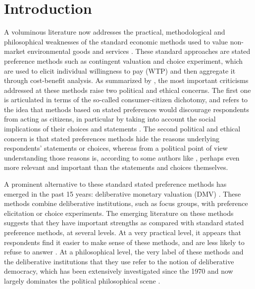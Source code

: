 \documentclass[version=3.21, pagesize, twoside=off, bibliography=totoc, DIV=calc, fontsize=12pt, a4paper, french, english]{scrartcl}
\begin{document}
\section{Introduction}
A voluminous literature now addresses the practical, methodological and philosophical weaknesses of the standard economic methods used to value non-market environmental goods and services \citep{meinard_ethical_2016}. 
These standard approaches are stated preference methods such as contingent valuation and choice experiment, which are used to elicit individual willingness to pay (WTP) and then aggregate it through cost-benefit analysis. 
As summarized by \citet{bartkowski_beyond_2018}, the most important criticisms addressed at these methods raise two political and ethical concerns. 
The first one is articulated in terms of the so-called consumer-citizen dichotomy, and refers to the idea that methods based on stated preferences would discourage respondents from acting as citizens, in particular by taking into account the social implications of their choices and statements \citep{soma_representing_2014, vatn_institutional_2009}. 
The second political and ethical concern is that stated preferences methods hide the reasons underlying respondents' statements or choices, whereas from a political point of view understanding those reasons is, according to some authors like \citet{sen_environmental_1995}, perhaps even more relevant and important than the statements and choices themselves.

A prominent alternative to these standard stated preference methods has emerged in the past 15 years: deliberative monetary valuation (DMV) \citep{spash_deliberative_2007,bartkowski_economic_2017}. 
These methods combine deliberative institutions, such as focus groups, with preference elicitation or choice experiments. 
The emerging literature on these methods suggests that they have important strengths as compared with standard stated preference methods, at several levels. 
At a very practical level, it appears that respondents find it easier to make sense of these methods, and are less likely to refuse to answer \citep{lienhoop_contingent_2007,szabo_reducing_2011}. 
At a philosophical level, the very label of these methods and the deliberative institutions that they use refer to the notion of deliberative democracy, which has been extensively investigated since the 1970 and now largely dominates the political philosophical scene \citep{chappell_deliberative_2012}.
\end{document}
